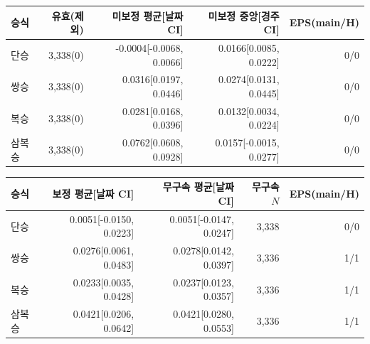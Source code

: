 \begin{tabular}{@{}lrrrr@{}}
\toprule
승식 & 유효(제외) & 미보정 평균[날짜 CI] & 미보정 중앙[경주 CI] & EPS(main/H) \\
\midrule
단승 & 3,338(0) & -0.0004[-0.0068, 0.0066] & 0.0166[0.0085, 0.0222] & 0/0 \\
쌍승 & 3,338(0) & 0.0316[0.0197, 0.0446] & 0.0274[0.0131, 0.0445] & 0/0 \\
복승 & 3,338(0) & 0.0281[0.0168, 0.0396] & 0.0132[0.0034, 0.0224] & 0/0 \\
삼복승 & 3,338(0) & 0.0762[0.0608, 0.0928] & 0.0157[-0.0015, 0.0277] & 0/0 \\
\bottomrule
\end{tabular}
\par\smallskip
\begin{tabular}{@{}lrrrr@{}}
\toprule
승식 & 보정 평균[날짜 CI] & 무구속 평균[날짜 CI] & 무구속 $N$ & EPS(main/H) \\
\midrule
단승 & 0.0051[-0.0150, 0.0223] & 0.0051[-0.0147, 0.0247] & 3,338 & 0/0 \\
쌍승 & 0.0276[0.0061, 0.0483] & 0.0278[0.0142, 0.0397] & 3,336 & 1/1 \\
복승 & 0.0233[0.0035, 0.0428] & 0.0237[0.0123, 0.0357] & 3,336 & 1/1 \\
삼복승 & 0.0421[0.0206, 0.0642] & 0.0421[0.0280, 0.0553] & 3,336 & 1/1 \\
\bottomrule
\end{tabular}
